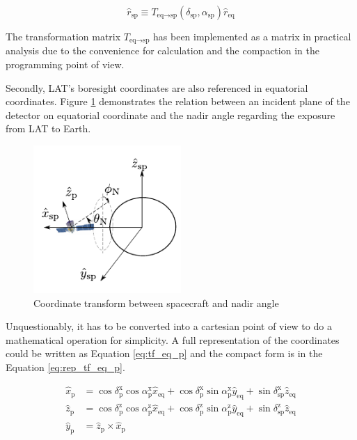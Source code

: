 \begin{equation}
    \hat{r}_\text{sp} \equiv T_{\text{eq}\rightarrow\text{sp}} (\delta_\text{sp}, \alpha_\text{sp}) \hat{r}_\text{eq}
    \label{eq:rep_tf_eq_sp}
\end{equation}

The transformation matrix $T_{\text{eq}\rightarrow\text{sp}}$ has been implemented as a matrix in practical
analysis due to the convenience for calculation and the compaction 
in the programming point of view.

Secondly, LAT's boresight coordinates are also referenced in equatorial coordinates. Figure \ref{fig:coord_eq_p} demonstrates the relation between
an incident plane of the detector on equatorial coordinate and the 
nadir angle regarding the exposure from LAT to Earth.

\begin{figure}[h!]
    \centering
    \includegraphics[width=0.5\textwidth]{content/methodology/figures/coord_eq_p.pdf}
    \caption{Coordinate transform between spacecraft and nadir angle}
    \label{fig:coord_eq_p}
\end{figure}

Unquestionably, it has to be converted into a cartesian point of view to do a mathematical operation for simplicity. A 
full representation of the coordinates could be written as Equation \ref{eq:tf_eq_p}
and the compact form is in the Equation \ref{eq:rep_tf_eq_p}.

\begin{equation}
    \begin{split}
    \hat{x}_\text{p} &= \cos\delta^\text{x}_\text{p}\cos\alpha^\text{x}_\text{p}\hat{x}_\text{eq} + \cos\delta^\text{x}_\text{p}\sin\alpha^\text{x}_\text{p}\hat{y}_\text{eq} + \sin\delta^\text{x}_\text{sp}\hat{z}_\text{eq}\\
    \hat{z}_\text{p} &= \cos\delta^\text{z}_\text{p}\cos\alpha^\text{z}_\text{p}\hat{x}_\text{eq} + \cos\delta^\text{z}_\text{p}\sin\alpha^\text{z}_\text{p}\hat{y}_\text{eq} + \sin\delta^\text{z}_\text{sp}\hat{z}_\text{eq}\\
    \hat{y}_\text{p} &= \hat{z}_\text{p} \times \hat{x}_\text{p}
    \end{split}
    \label{eq:tf_eq_p}
\end{equation}

